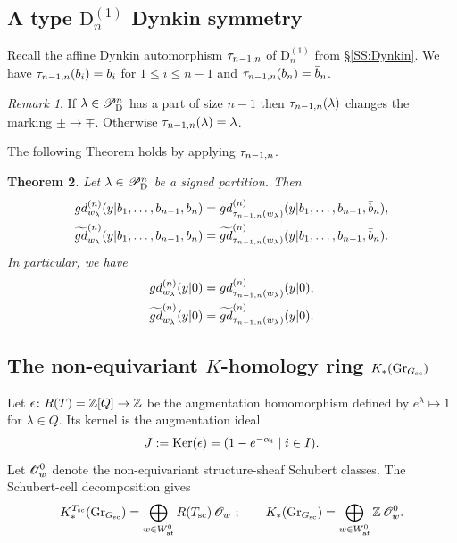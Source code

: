 \documentclass[a4paper]{amsart}
\newcommand{\koushik}[1]{\todo[size=\tiny,color=green!30]{#1}}
\newtheorem{thm}{Theorem}[section]
\theoremstyle{remark}
\newtheorem{remark}[thm]{Remark}
\numberwithin{equation}{section}
\begin{document}
\subsection{A type $\mathrm{D}_n^{(1)}$ Dynkin symmetry}\label{subsec_dyn_sym}


Recall the affine Dynkin automorphism $\autn$ of $\mathrm{D}_n^{(1)}$ from \S \ref{SS:Dynkin}.
We have $\autn(b_i)=b_i$ for $1\le i\le n-1$ and $\autn(b_n)=\bar{b}_n$.

\begin{remark} If $\la\in \Y^n_{\D{}}$ has a part of size $n-1$ then $\autn(\la)$ changes the marking $\pm \to \mp$. Otherwise $\autn(\la)=\la$.
\end{remark}

The following Theorem holds by applying $\autn$.

\begin{thm}\label{T:gd auto}
Let $\lambda\in \Y^n_{\D{}}$ be a signed partition. Then 
\begin{align}
\gd{w_{\la}}{n}(y| b_1,\dotsc,b_{n-1},b_n) &= 
  \gd{\autn(w_{\la})}{n}(y| b_1,\dotsc,b_{n-1},\bar{b}_n), \\
  \tgd{w_{\la}}{n}(y| b_1,\dotsc,b_{n-1},b_n) &= 
  \tgd{\autn(w_{\la})}{n}(y| b_1,\dotsc,b_{n-1},\bar{b}_n).
\end{align}
In particular, we have
\begin{align}
\gd{w_{\la}}{n}(y| 0) &= 
  \gd{\autn(w_{\la})}{n}(y| 0), \label{eq:non-eq:gd1}\\
  \tgd{w_{\la}}{n}(y| 0) &= 
  \tgd{\autn(w_{\la})}{n}(y| 0).\label{eq:non-eq:gd2}
\end{align}
\end{thm}


\subsection{The non-equivariant $K$-homology ring $K_*(\Gr_{\Gsc})$}
\label{sec:non-eq}
Let $\epsilon\colon\RT=\Z[Q]\to\Z$ be the augmentation
homomorphism defined by $e^\lambda\mapsto 1$ for $\lambda\in Q$.
Its kernel is the augmentation ideal
\[
J:=\Ker(\epsilon)
  =(1-e^{-\alpha_i}\mid i\in I).
\]
Let \(\cO{w}^0\) denote the non-equivariant structure-sheaf Schubert classes. The Schubert-cell decomposition gives
\[
K_*^{T_{\mathrm{sc}}}(\Gr_{\Gsc})
=\bigoplus_{w\in W_{\mathrm{af}}^0}R(\Tsc)\,\mathscr O_w ~;
\qquad
K_*(\Gr_{\Gsc})
=\bigoplus_{w\in W_{\mathrm{af}}^0}\mathbb Z\,\mathscr O_w^0.
\]
\end{document}
